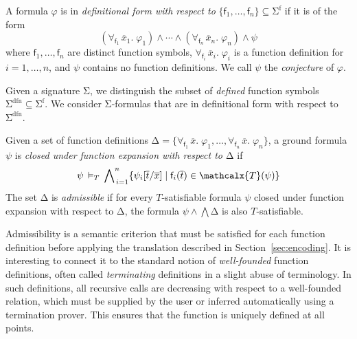 \documentclass[runningheads,a4paper]{llncs}
\renewcommand\models{\mathrel{\vDash}}
\newcommand\DDD{\Delta}
\newcommand{\con}[1]{\mathsf{#1}}
\renewcommand\vec[1]{\overline{#1}}
\let\oldSigma=\Sigma
\def\Sigma{\mathrm{\oldSigma}}
\let\oldDelta=\Delta
\def\Delta{\mathrm{\oldDelta}}
\let\oldwedge=\wedge
\def\wedge{\mathrel{\oldwedge}}
\newcommand{\terms}{\mathcalx{T}}
\newcommand{\sfuns}[1]{#1^\mathrm{f}}
\newcommand{\sfundefs}[1]{#1^\mathrm{dfn}}
\newcommand{\forallf}[1]{\forall_{\!#1\:}}
\newcommand{\rem}[1]{\textcolor{red}{[#1]}}
\newcommand{\jb}[1]{\rem{#1 --jb}}
\newcommand{\ct}[1]{\rem{#1 --ct}}
\begin{document}
\begin{definition}\rm
A formula $\varphi$ is in \emph{definitional form with respect to}
$\{ \con{f}_1, \ldots, \con{f}_n \} \subseteq \sfuns{\Sigma}$ if it is of the
form
%
%
\[(\forallf{\con{f}_1} \vec x_1.\; \varphi_1) \wedge \cdots \wedge
(\forallf{\con{f}_n} \vec x_n.\; \varphi_n) \wedge \psi\]
%
where $\con{f}_1, \ldots, \con{f}_n$ are distinct function symbols,
$\forallf{\con{f}_i} \vec x_i.\; \varphi_i$ is a function definition
for $i = 1, \ldots, n$,
%
and $\psi$ contains no function definitions.
We call $\psi$ the \emph{conjecture} of $\varphi$.
\end{definition}

Given a signature $\Sigma$, we distinguish the subset of \emph{defined}
function symbols $\sfundefs{\Sigma} \subseteq \sfuns{\Sigma}$.
We consider $\Sigma$-formulas that are in definitional form with respect to
$\sfundefs{\Sigma}$.

\begin{definition}\rm
Given a set of function definitions 
$\DDD = \{ \forallf{\con{f}_1} \vec x.\; \varphi_1, \ldots, \forallf{\con{f}_n} \vec x.\; \varphi_n \}$, 
a ground formula $\psi$ 
is \emph{closed under function expansion with respect to $\DDD$} if 
\[
 \psi \,\models_T\, \bigwedge\nolimits_{\,i=1}^{n} \{ \psi_i[ \vec t / \vec x ] \mid \con{f}_i( \vec t ) \in \terms( \psi ) \} %
\]
The set $\DDD$ is \emph{admissible} if for every $T$-satisfiable formula 
$\psi$ closed under function expansion with respect to $\DDD$,
the formula
$\psi \wedge \bigwedge \Delta$ is also $T$-satisfiable.
\end{definition}

Admissibility is a semantic criterion that must be satisfied for each function
definition before applying the translation described in
Section~\ref{sec:encoding}. It is interesting to connect it to the
standard notion of \emph{well-founded} function definitions, often called
\emph{terminating} definitions in a slight abuse of terminology. In such
definitions, all recursive calls are decreasing with respect to a well-founded
relation, which must be supplied by the user or inferred automatically
using a termination prover. This ensures that the function is uniquely defined
at all points.
\end{document}
